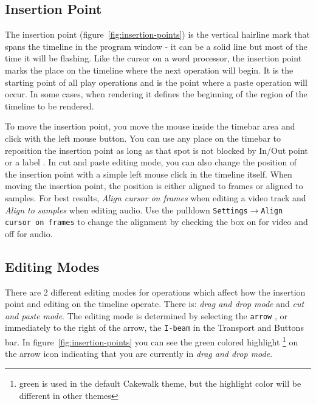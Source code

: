 \subsection{Insertion Point}%
\label{sub:insertion_point}

The insertion point (figure~\ref{fig:insertion-points}) is the vertical hairline mark that spans the timeline in the program window - it can be a solid line but most of the time it will be flashing. 
Like the cursor on a word processor, the insertion point marks the place on the timeline where the next
operation will begin. It is the starting point of all play operations and is the point where a paste operation will occur. 
In some cases, when rendering it defines the beginning of the region of the timeline to be rendered. 

To move the insertion point, you move the mouse inside the timebar  area and click with the left mouse button. 
You can use any place on the timebar to reposition the insertion point as long as that spot is not blocked
by In/Out point  or a label . 
In cut and paste editing mode, you can also change the position of the insertion point with a simple 
left mouse click in the timeline itself.
When moving the insertion point, the position is either aligned to frames or aligned to samples. 
For best results, \textit{Align cursor on frames}  when editing a video track and \textit{Align to samples}  when editing audio. 
Use the pulldown \texttt{Settings$\rightarrow$Align cursor on frames} to change the alignment by
checking the box on for video and off for audio.


\subsection{Editing Modes}%
\label{sub:editing_modes}

There are 2 different editing modes for operations which affect how the insertion point and editing
on the timeline operate.  
There is:  \emph{drag and drop mode} and \emph{cut and paste mode}. 
The editing mode is determined by selecting the \texttt{arrow} , or immediately to the right of the arrow,
the \texttt{I-beam}  in the Transport and Buttons bar. In figure~\ref{fig:insertion-points} you can see the green colored highlight \protect\footnote{green is used in the default Cakewalk theme, but the highlight color will be different in other themes} on the arrow icon indicating that you are currently in \emph{drag and drop mode}.

